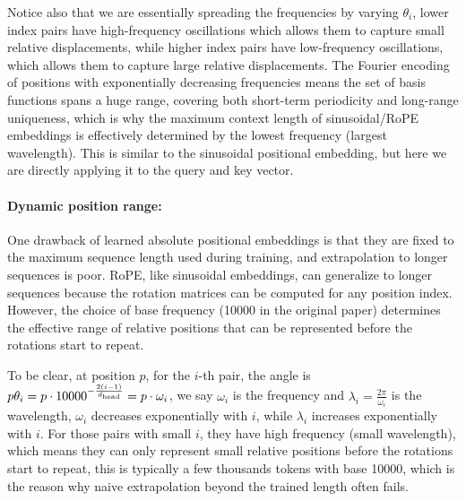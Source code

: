 \documentclass[11pt]{article}  %
\begin{document}
Notice also that we are essentially spreading the frequencies by varying $\theta_i$, lower index pairs have high-frequency oscillations which allows them to capture small relative displacements, while higher index pairs have low-frequency oscillations, which allows them to capture large relative displacements.
The Fourier encoding of positions with exponentially decreasing frequencies means the set of basis functions spans a huge range, covering both short-term periodicity and long-range uniqueness, which is why the maximum context length of sinusoidal/RoPE embeddings is effectively determined by the lowest frequency (largest wavelength).
This is similar to the sinusoidal positional embedding, but here we are directly applying it to the query and key vector.


\paragraph{Dynamic position range:}
One drawback of learned absolute positional embeddings is that they are fixed to the maximum sequence length used during training, and extrapolation to longer sequences is poor.
RoPE, like sinusoidal embeddings, can generalize to longer sequences because the rotation matrices can be computed for any position index.
However, the choice of base frequency (10000 in the original paper) determines the effective range of relative positions that can be represented before the rotations start to repeat.

To be clear, at position $p$, for the $i$-th pair, the angle is $p\theta_i = p \cdot 10000^{-\frac{2(i - 1)}{d_{\text{head}}}} = p \cdot \omega_i$, we say $\omega_i$ is the frequency and $\lambda_i = \frac{2\pi}{\omega_i}$ is the wavelength, $\omega_i$ decreases exponentially with $i$, while $\lambda_i$ increases exponentially with $i$.
For those pairs with small $i$, they have high frequency (small wavelength), which means they can only represent small relative positions before the rotations start to repeat, this is typically a few thousands tokens with base 10000, which is the reason why naive extrapolation beyond the trained length often fails.
\end{document}
